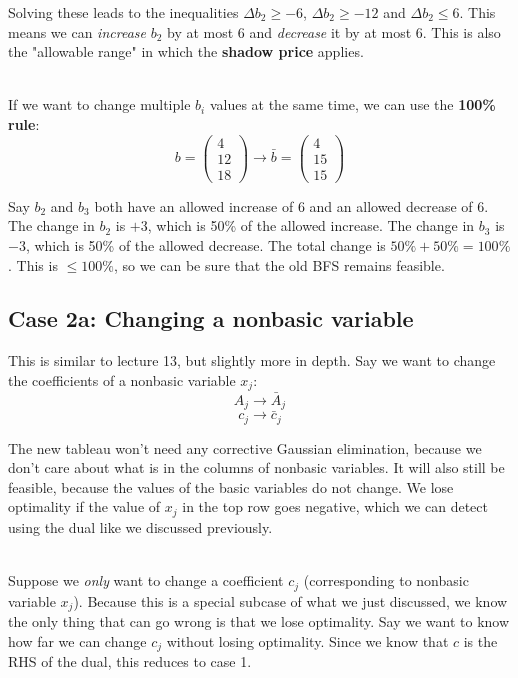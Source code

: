 \documentclass[12pt]{article}
\begin{document}
\noindent
Solving these leads to the inequalities $\Delta b_2 \geq -6$, $\Delta b_2 \geq -12$ and $\Delta b_2 \leq 6$.
This means we can \textit{increase} $b_2$ by at most 6 and \textit{decrease} it by at most 6.
This is also the "allowable range" in which the \textbf{shadow price} applies.

\noindent
\\
If we want to change multiple $b_i$ values at the same time, we can use the \textbf{100\% rule}:
\[ b = \begin{pmatrix}
    4\\
    12\\
    18
\end{pmatrix} \rightarrow \bar{b} = \begin{pmatrix}
    4\\
    15\\
    15
\end{pmatrix} \]

\noindent
Say $b_2$ and $b_3$ both have an allowed increase of 6 and an allowed decrease of 6.
The change in $b_2$ is $+3$, which is 50\% of the allowed increase.
The change in $b_3$ is $-3$, which is 50\% of the allowed decrease.
The total change is $50\% + 50\% = 100\%$.
This is $\leq 100\%$, so we can be sure that the old BFS remains feasible.
 
\newpage
\subsection*{Case 2a: Changing a nonbasic variable}
This is similar to lecture 13, but slightly more in depth.
Say we want to change the coefficients of a nonbasic variable $x_j$:
\[ A_j \rightarrow \bar{A}_j \]
\[ c_j \rightarrow \bar{c}_j \]

\noindent
The new tableau won't need any corrective Gaussian elimination, because we don't care about what is in the columns of nonbasic variables.
It will also still be feasible, because the values of the basic variables do not change.
We lose optimality if the value of $x_j$ in the top row goes negative, which we can detect using the dual like we discussed previously.

\noindent
\\
Suppose we \textit{only} want to change a coefficient $c_j$ (corresponding to nonbasic variable $x_j$).
Because this is a special subcase of what we just discussed, we know the only thing that can go wrong is that we lose optimality.
Say we want to know how far we can change $c_j$ without losing optimality.
Since we know that $c$ is the RHS of the dual, this reduces to case 1.
\end{document}
